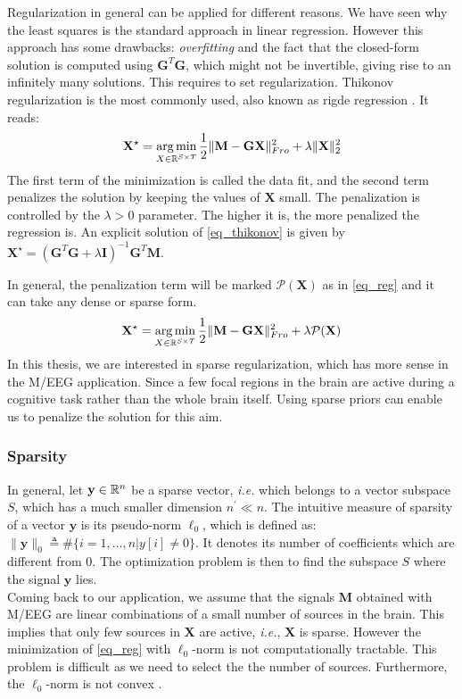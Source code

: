 Regularization in general can be applied for different reasons. We have seen why the least squares is the standard approach in linear regression. However this approach has some drawbacks: \textit{overfitting} and the fact that the closed-form solution is computed using $\mathbf{G}^T\mathbf{G}$, which might not be invertible, giving rise to an infinitely many solutions. This requires to set regularization. Thikonov regularization \cite{tikhonov1977solutions} is the most commonly used, also known as rigde regression \cite{hoerl1970ridge}. It reads:
\begin{equation} \label{eq_thikonov}
	\mathbf{X}^\star = \mathop{\mathrm{arg}\,\mathrm{min}}_{X\in\mathbb{R}^{S\times T}}\frac{1}{2}\|\mathbf{M}-\mathbf{GX}\|_{Fro}^2 + \lambda\|\mathbf{X}\|_2^2
\end{equation}
The first term of the minimization is called the data fit, and the second term penalizes the solution by keeping the values of $\mathbf{X}$ small. The penalization is controlled by the $\lambda>0$ parameter. The higher it is, the more penalized the regression is. An explicit solution of \ref{eq_thikonov} is given by $\mathbf{X}^\star = (\mathbf{G}^T\mathbf{G}+\lambda\mathbf{I})^{-1}\mathbf{G}^T\mathbf{M}$. 

In general, the penalization term will be marked $\mathcal{P}(\mathbf{X})$ as in \ref{eq_reg} and it can take any dense or sparse form.
\begin{equation} \label{eq_reg}
	\mathbf{X}^\star = \mathop{\mathrm{arg}\,\mathrm{min}}_{X\in\mathbb{R}^{S\times T}}\frac{1}{2}\|\mathbf{M}-\mathbf{GX}\|_{Fro}^2 + \lambda\mathcal{P}(\mathbf{X})
\end{equation}
In this thesis, we are interested in sparse regularization, which has more sense in the M/EEG application. Since a few focal regions in the brain are active during a cognitive task rather than the whole brain itself. Using sparse priors can enable us to penalize the solution for this aim.

\adjustwidth{1em}{0pt}
\subsubsection*{Sparsity}
In general, let $\mathbf{y}\in\mathbb{R}^n$ be a sparse vector, \textit{i.e.} which belongs to a vector subspace $S$, which has a much smaller dimension $n^\prime\ll n$. 
The intuitive measure of sparsity of a vector $\mathbf{y}$ is its pseudo-norm $\ell_0$, which is defined as: $\|\mathbf{y}\|_0\triangleq \#\{i=1,\dots ,n  |y[i]\neq 0\}$. It denotes its number of coefficients which are different from 0. The optimization problem is then to find the subspace $S$ where the signal $\mathbf{y}$ lies.\\
\endadjustwidth
Coming back to our application, we assume that the signals $\mathbf{M}$ obtained with M/EEG are linear combinations of a small number of sources in the brain. This implies that only few sources in $\mathbf{X}$ are active, \textit{i.e.}, $\mathbf{X}$ is sparse. However the minimization of \ref{eq_reg} with $\ell_0$-norm is not computationally tractable. This problem is difficult as we need to select the the number of sources. Furthermore, the $\ell_0$-norm is not convex \cite{natarajan1995sparse}.

